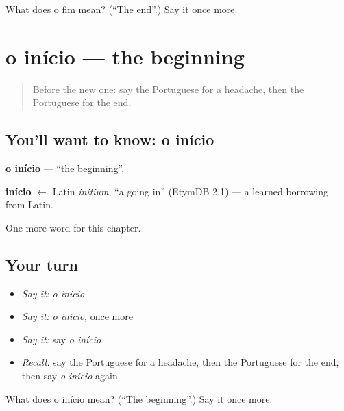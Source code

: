 \begin{tcolorbox}[breakable,colback=teal!4,colframe=teal!35!black,title={Before you move on}]
What does o fim mean? (\textquotedblleft{}The end\textquotedblright{}.) Say it once more.
\end{tcolorbox}
\section[o início]{o início — the beginning}

\label{lesson:PT-C212-inicio}



\begin{quote}
Before the new one: say the Portuguese for a headache, then the Portuguese for the end.
\end{quote}

\subsection*{You'll want to know: o início}
\textbf{o início} — \textquotedblleft{}the beginning\textquotedblright{}.

\begin{cousinweb}
\textbf{início} $\leftarrow$ Latin \emph{initium}, \textquotedblleft{}a going in\textquotedblright{} (EtymDB 2.1) — a learned borrowing from Latin.
\end{cousinweb}

\begin{grammarlens}[title={What you've built}]
One more word for this chapter.
\end{grammarlens}

\subsection*{Your turn}
\begin{itemize}
\raggedright
  \item \emph{Say it:} \emph{o início}
  \item \emph{Say it:} \emph{o início}, once more
  \item \emph{Say it:} say \emph{o início}
  \item \emph{Recall:} say the Portuguese for a headache, then the Portuguese for the end, then say \emph{o início} again
\end{itemize}

\begin{tcolorbox}[breakable,colback=teal!4,colframe=teal!35!black,title={Before you move on}]
What does o início mean? (\textquotedblleft{}The beginning\textquotedblright{}.) Say it once more.
\end{tcolorbox}
